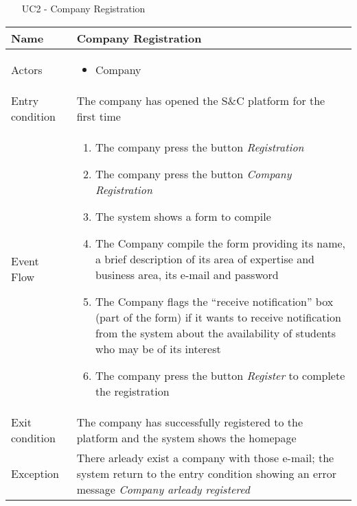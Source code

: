 			
			\begin{table} [H]
				\centering
					\begin{itemize}
					\item [UC2] - Company Registration
				\end{itemize}
				\begin{tabular}{|| P{7.5cm} | P{7.5cm} ||}
					\hline
					Name & Company Registration \\
					\hline
					Actors & \parbox{5cm}{\begin{itemize}
							\item Company
						\end{itemize}
					} \\
					\hline
					Entry condition & The company has opened the S\&C platform for the first time \\
					\hline
					Event Flow & \parbox{5cm}{\begin{enumerate}[label=\alpha]
							\item The company press the button \textit{Registration}
							\item The company press the button \textit{Company Registration}
							\item The system shows a form to compile
							\item The Company compile the form 
							providing its name, a brief description 
							of its area of expertise and business 
							area, its e-mail and password
							\item The Company flags the “receive 
							notification” box (part of the form) if it 
							wants to receive notification from the 
							system about the availability of 
							students who may be of its interest
							\item The company press the button 
							\textit{Register} to complete the 
							registration
					\end{enumerate}} \\
					\hline 
					Exit condition & The company has successfully registered 
					to the platform and the system shows the 
					homepage \\
					\hline
					Exception & There arleady exist a company with 
					those e-mail; the system return to 
					the entry condition showing an 
					error message \textit{Company arleady 
						registered} \\
					\hline
				\end{tabular}
			\end{table}
			
